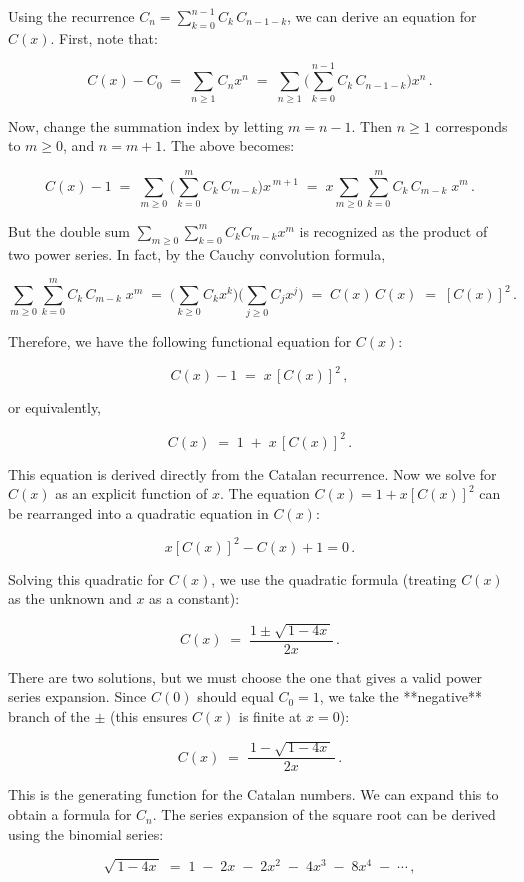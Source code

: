 \documentclass{article}
\begin{document}
Using the recurrence $C_n = \sum_{k=0}^{n-1} C_k\,C_{n-1-k}$, we can derive an equation for $C(x)$. First, note that:

\[
C(x) - C_0 \;=\; \sum_{n\ge 1} C_n x^n \;=\; \sum_{n\ge 1}\Big(\sum_{k=0}^{n-1} C_k\,C_{n-1-k}\Big) x^n\,.
\]

Now, change the summation index by letting $m = n-1$. Then $n\ge 1$ corresponds to $m \ge 0$, and $n = m+1$. The above becomes:

\[
C(x) - 1 \;=\; \sum_{m\ge 0} \Big(\sum_{k=0}^{m} C_k\,C_{m-k}\Big) x^{\,m+1} \;=\; x \sum_{m\ge 0} \sum_{k=0}^{m} C_k\,C_{m-k}\; x^m\,.
\]

But the double sum $\sum_{m\ge 0}\sum_{k=0}^{m} C_k C_{m-k} x^m$ is recognized as the product of two power series. In fact, by the Cauchy convolution formula, 

\[
\sum_{m\ge 0}\sum_{k=0}^{m} C_k\,C_{m-k}\; x^m \;=\; \Big(\sum_{k\ge 0} C_k x^k\Big)\Big(\sum_{j\ge 0} C_j x^j\Big) \;=\; C(x)\,C(x) \;=\; [C(x)]^2\,.
\]

Therefore, we have the following functional equation for $C(x)$:

\[
C(x) - 1 \;=\; x\,[C(x)]^2\,,
\] 

or equivalently,

\[
C(x) \;=\; 1 \;+\; x\,[C(x)]^2\,.
\]

This equation is derived directly from the Catalan recurrence. Now we solve for $C(x)$ as an explicit function of $x$. The equation $C(x) = 1 + x[C(x)]^2$ can be rearranged into a quadratic equation in $C(x)$:

\[
x [C(x)]^2 - C(x) + 1 = 0\,.
\]

Solving this quadratic for $C(x)$, we use the quadratic formula (treating $C(x)$ as the unknown and $x$ as a constant):

\[
C(x) \;=\; \frac{1 \pm \sqrt{\,1 - 4x\,}}{2x}\,. 
\]

There are two solutions, but we must choose the one that gives a valid power series expansion. Since $C(0)$ should equal $C_0 = 1$, we take the **negative** branch of the $\pm$ (this ensures $C(x)$ is finite at $x=0$):

\[
C(x) \;=\; \frac{\,1 - \sqrt{\,1 - 4x\,}\,}{2x}\,.
\]

This is the generating function for the Catalan numbers. We can expand this to obtain a formula for $C_n$. The series expansion of the square root can be derived using the binomial series:

\[
\sqrt{\,1 - 4x\,} \;=\; 1 \;-\; 2x \;-\; 2x^2 \;-\; 4x^3 \;-\; 8x^4 \;-\; \cdots\,,
\] 
\end{document}
